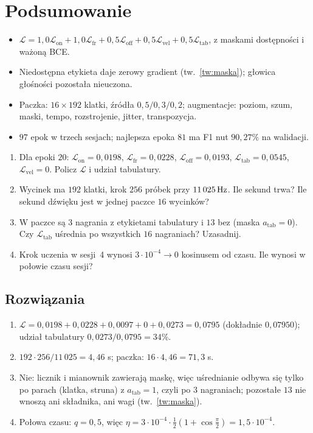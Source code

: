 \section*{Podsumowanie}
\begin{itemize}
\item $\mathcal L=1{,}0\mathcal L_\mathrm{on}+1{,}0\mathcal L_\mathrm{fr}+0{,}5\mathcal L_\mathrm{off}+0{,}5\mathcal L_\mathrm{vel}+0{,}5\mathcal L_\mathrm{tab}$, z maskami dostępności i ważoną BCE.
\item Niedostępna etykieta daje zerowy gradient (tw.~\ref{tw:maska}); głowica głośności pozostała nieuczona.
\item Paczka: $16\times192$ klatki, źródła $0{,}5/0{,}3/0{,}2$; augmentacje: poziom, szum, maski, tempo, rozstrojenie, jitter, transpozycja.
\item $97$ epok w trzech sesjach; najlepsza epoka $81$ ma F1 nut $90{,}27\%$ na walidacji.
\end{itemize}

\begin{sprawdz}
\begin{enumerate}
\item Dla epoki $20$: $\mathcal L_\mathrm{on}=0{,}0198$, $\mathcal L_\mathrm{fr}=0{,}0228$, $\mathcal L_\mathrm{off}=0{,}0193$, $\mathcal L_\mathrm{tab}=0{,}0545$, $\mathcal L_\mathrm{vel}=0$. Policz $\mathcal L$ i udział tabulatury.
\item Wycinek ma $192$ klatki, krok $256$ próbek przy $11\,025\,\mathrm{Hz}$. Ile sekund trwa? Ile sekund dźwięku jest w jednej paczce $16$ wycinków?
\item W paczce są $3$ nagrania z etykietami tabulatury i $13$ bez (maska $a_\mathrm{tab}=0$). Czy $\mathcal L_\mathrm{tab}$ uśrednia po wszystkich $16$ nagraniach? Uzasadnij.
\item Krok uczenia w sesji~4 wynosi $3\cdot10^{-4}\to0$ kosinusem od czasu. Ile wynosi w połowie czasu sesji?
\end{enumerate}
\end{sprawdz}

\subsection*{Rozwiązania}
\begin{enumerate}
\item $\mathcal L=0{,}0198+0{,}0228+0{,}0097+0+0{,}0273=0{,}0795$ (dokładnie $0{,}07950$); udział tabulatury $0{,}0273/0{,}0795=34\%$.
\item $192\cdot256/11\,025=4{,}46$ s; paczka: $16\cdot4{,}46=71{,}3$ s.
\item Nie: licznik i mianownik zawierają maskę, więc uśrednianie odbywa się tylko po parach (klatka, struna) z $a_\mathrm{tab}=1$, czyli po $3$ nagraniach; pozostałe $13$ nie wnoszą ani składnika, ani wagi (tw.~\ref{tw:maska}).
\item Połowa czasu: $q=0{,}5$, więc $\eta=3\cdot10^{-4}\cdot\tfrac12(1+\cos\tfrac\pi2)=1{,}5\cdot10^{-4}$.
\end{enumerate}
